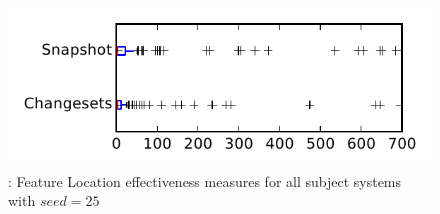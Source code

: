 
\begin{figure}
\centering
\includegraphics[height=0.4\textheight]{figures/flt_seed/rq1_tiny_25}
\caption{\rone: Feature Location effectiveness measures for all subject systems with $seed=25$}
\label{fig:flt_seed:rq1:tiny}
\end{figure}
